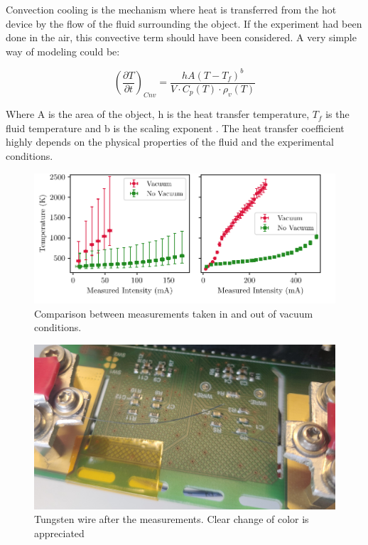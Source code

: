 Convection cooling is the mechanism where heat is transferred from the hot device by the flow of the fluid surrounding the object. If the experiment had been done in the air, this convective term should have been considered. A very simple way of modeling could be: 

\begin{equation}
    \left(\frac{\partial T}{\partial t}\right)_{Cnv} = \frac{hA\left(T - T_{f} \right)^{b}}{V\cdot C_{p}(T)\cdot \rho_v(T)}
\end{equation}

Where A is the area of the object, h is the heat transfer temperature, $T_f$ is the fluid temperature and b is the scaling exponent \parencite[][]{ref:Convection}. The heat transfer coefficient highly depends on the physical properties of the fluid and the experimental conditions. 

\begin{figure}[h]
    \centering
    \includegraphics[width=1.0\columnwidth]{Figure_ConvVSnoConv/ConvNotConv.pdf}
    \caption{Comparison between measurements taken in and out of vacuum conditions. }
    \label{fig:ConvectionEffect}
\end{figure}

\begin{figure}[h]
    \centering
    \includegraphics[width=0.7\columnwidth]{Figure_ColorChange/PictureWire.jpg}
    \caption{Tungsten wire after the measurements. Clear change of color is appreciated}
    \label{fig:Oxidation}
\end{figure}


